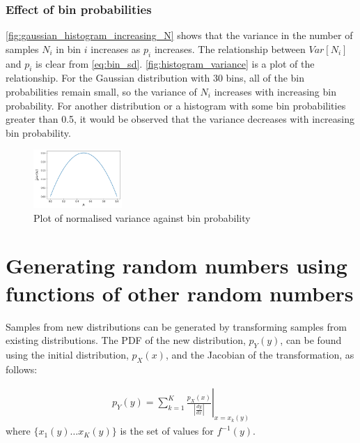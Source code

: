 \documentclass[a4paper]{article}
\begin{document}

\subsubsection{Effect of bin probabilities}
\autoref{fig:gaussian_histogram_increasing_N} shows that the variance in the number of samples $N_i$ in bin $i$
increases as $p_i$ increases.
The relationship between $Var[N_i]$ and $p_i$ is clear from \autoref{eq:bin_sd}. \autoref{fig:histogram_variance} is a
plot of the relationship. For the Gaussian distribution with 30 bins, all of the bin probabilities remain small, so the
variance of $N_i$ increases with increasing bin probability. For another distribution or a histogram with some bin
probabilities greater than 0.5, it would be observed that the variance decreases with increasing bin probability.

\begin{figure}[h]
    \centering
    \includegraphics[width=0.3\textwidth]{figures/histogram_variance.png}
    \caption{Plot of normalised variance against bin probability}
    \label{fig:histogram_variance}
\end{figure}



\section{Generating random numbers using functions of other random numbers}

Samples from new distributions can be generated by transforming samples from existing distributions.
The PDF of the new distribution, $p_Y(y)$, can be found using the initial distribution, $p_X(x)$, and
the Jacobian of the transformation, as follows:

\begin{align*}
    p_Y(y) = \sum_{k=1}^K \left. \frac{p_X(x)}{\left|\frac{dy}{dx}\right|} \right|_{x=x_k(y)}
\end{align*}
where $\{x_1(y) \dots x_K(y)\}$ is the set of values for $f^{-1}(y)$.
\end{document}
